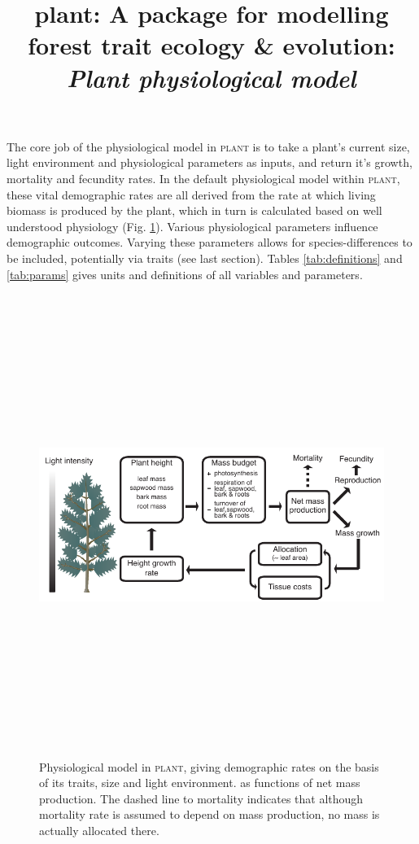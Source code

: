 \documentclass[10pt,twoside]{article}
\title{plant: A package for modelling forest trait ecology \& evolution:
\emph{Plant physiological model}}
\date{}
\newcommand{\plant}{\textsc{plant}}
\begin{document}
\maketitle


The core job of the physiological model in {\plant} is to take a plant's
current size, light environment and physiological parameters as inputs,
and return it's growth, mortality and fecundity rates. In the default
physiological model within {\plant}, these vital demographic rates are all
derived from the rate at which living biomass is produced by the plant,
which in turn is calculated based on well understood physiology (Fig.
\ref{fig:schematic-phys}). Various physiological parameters
influence demographic outcomes. Varying these parameters allows for
species-differences to be included, potentially via traits (see last
section). Tables
\ref{tab:definitions} and \ref{tab:params} gives units and definitions of all variables
and parameters. 

\begin{figure}[h!]
\centering
\includegraphics[width=15cm,height=15cm,keepaspectratio]{../figures/schematic-phys}
\caption{Physiological model in {\plant}, giving
demographic rates on the basis of its traits, size and light environment. as functions of 
net mass production. The dashed line to mortality indicates that although mortality rate is assumed to depend on mass production, no 
mass is actually allocated there.}
\label{fig:schematic-phys}
\end{figure}
\end{document}
